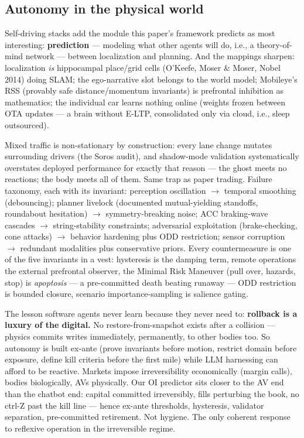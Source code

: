 \documentclass[11pt]{article}
\begin{document}
\subsection{Autonomy in the physical world}

Self-driving stacks add the module this paper's framework predicts as most interesting: \textbf{prediction} --- modeling what other agents will do, i.e., a theory-of-mind network --- between localization and planning. And the mappings sharpen: localization \emph{is} hippocampal place/grid cells (O'Keefe, Moser \& Moser, Nobel 2014) doing SLAM; the ego-narrative slot belongs to the world model; Mobileye's RSS (provably safe distance/momentum invariants) is prefrontal inhibition as mathematics; the individual car learns nothing online (weights frozen between OTA updates --- a brain without E-LTP, consolidated only via cloud, i.e., sleep outsourced).

Mixed traffic is non-stationary by construction: every lane change mutates surrounding drivers (the Soros audit), and shadow-mode validation systematically overstates deployed performance for exactly that reason --- the ghost meets no reactions; the body meets all of them. Same trap as paper trading. Failure taxonomy, each with its invariant: perception oscillation $\to$ temporal smoothing (debouncing); planner livelock (documented mutual-yielding standoffs, roundabout hesitation) $\to$ symmetry-breaking noise; ACC braking-wave cascades $\to$ string-stability constraints; adversarial exploitation (brake-checking, cone attacks) $\to$ behavior hardening plus ODD restriction; sensor corruption $\to$ redundant modalities plus conservative priors. Every countermeasure is one of the five invariants in a vest: hysteresis is the damping term, remote operations the external prefrontal observer, the Minimal Risk Maneuver (pull over, hazards, stop) is \emph{apoptosis} --- a pre-committed death beating runaway --- ODD restriction is bounded closure, scenario importance-sampling is salience gating.

The lesson software agents never learn because they never need to: \textbf{rollback is a luxury of the digital.} No restore-from-snapshot exists after a collision --- physics commits writes immediately, permanently, to other bodies too. So autonomy is built ex-ante (prove invariants before motion, restrict domain before exposure, define kill criteria before the first mile) while LLM harnessing can afford to be reactive. Markets impose irreversibility economically (margin calls), bodies biologically, AVs physically. Our OI predictor sits closer to the AV end than the chatbot end: capital committed irreversibly, fills perturbing the book, no ctrl-Z past the kill line --- hence ex-ante thresholds, hysteresis, validator separation, pre-committed retirement. Not hygiene. The only coherent response to reflexive operation in the irreversible regime.
\end{document}
